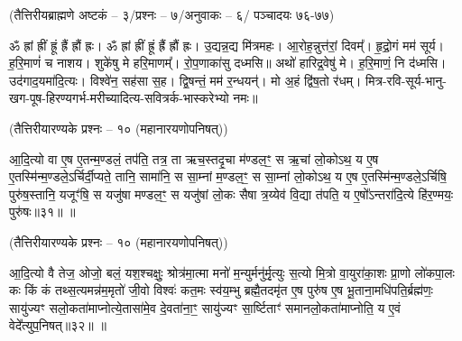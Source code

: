 \centerline{\normalsize (तैत्तिरीयब्राह्मणे अष्टकं – ३/प्रश्नः – ७/अनुवाकः – ६/ पञ्चादयः ७६-७७)}

ॐ ह्रां ह्रीं ह्रूं ह्रैं ह्रौं ह्रः। ॐ ह्रां ह्रीं ह्रूं ह्रैं ह्रौं ह्रः। 
उ॒द्यन्न॒द्य मि॑त्रमहः। 
आ॒रोह॒न्नुत्त॑रां॒ दिवम्᳚।
हृ॒द्रो॒गं मम॑ सूर्य।
ह॒रि॒माणं॑ च नाशय।
शुके॑षु मे हरि॒माणम्᳚।
रो॒प॒णाका॑सु दध्मसि॥
अथो॑ हारिद्र॒वेषु॑ मे।
ह॒रि॒माणं॒ नि द॑ध्मसि।
उद॑गाद॒यमा॑दि॒त्यः।
विश्वे॑न॒ सह॑सा स॒ह।
द्वि॒षन्तं॒ मम॑ र॒न्धयन्॑।
मो अ॒हं द्वि॑ष॒तो र॑धम्।
मित्र-रवि-सूर्य-भानु-खग-पूष-हिरण्यगर्भ-मरीच्यादित्य-सवित्रर्क-भास्करेभ्यो नमः॥

\centerline{\normalsize (तैत्तिरीयारण्यके प्रश्नः – १० (महानारयणोपनिषत्))}
आ॒दि॒त्यो वा ए॒ष ए॒तन्म॒ण्डलं॒ तप॑ति॒ तत्र॒ ता ऋच॒स्तदृ॒चा म॑ण्डल॒ꣳ॒ स ऋ॒चां लो॒कोऽथ॒ य ए॒ष ए॒तस्मि॑न्म॒ण्डले॒ऽर्चिर्दी॒प्यते॒ तानि॒ सामा॑नि॒ स सा॒म्नां म॒ण्डल॒ꣳ॒ स सा॒म्नां लो॒कोऽथ॒ य ए॒ष ए॒तस्मि॑न्म॒ण्डले॒ऽर्चिषि॒ पुरु॑ष॒स्तानि॒ यजूꣳ॑षि॒ स यजु॑षा मण्डल॒ꣳ॒ स यजु॑षां लो॒कः सैषा त्र॒य्येव॑ वि॒द्या त॑पति॒ य ए॒षो᳚ऽन्तरा॑दि॒त्ये हि॑र॒ण्मयः॒ पुरु॑षः॥३१॥
\devAya{}॥


\centerline{\normalsize (तैत्तिरीयारण्यके प्रश्नः – १० (महानारयणोपनिषत्))}
आ॒दि॒त्यो वै तेज॒ ओजो॒ बलं॒ यश॒श्चक्षुः॒ श्रोत्र॑मा॒त्मा मनो॑ म॒न्युर्मनु॑र्मृ॒त्युः स॒त्यो मि॒त्रो वा॒युरा॑का॒शः प्रा॒णो लो॑कपा॒लः कः किं कं तथ्स॒त्यमन्न॑म॒मृतो॑ जी॒वो विश्वः॑ कत॒मः स्व॑य॒म्भु ब्रह्मै॒तदमृ॑त ए॒ष पुरु॑ष ए॒ष भू॒ताना॒मधि॑पति॒र्ब्रह्म॑णः॒ सायु॑ज्यꣳ सलो॒कता॑माप्नोत्ये॒तासा॑मे॒व दे॒वता॑ना॒ꣳ॒ सायु॑ज्यꣳ सा॒र्ष्टिताꣳ॑ समानलो॒कता॑माप्नोति॒ य ए॒वं वेदे᳚त्युप॒निषत्॥३२॥
\devAya{}॥

\begingroup
\setlength{\parindent}{1.5em}
\makeatletter
  \def\vhrulefill#1{\leavevmode\leaders\hrule\@height#1\hfill \kern\z@}
\makeatother
\newcommand{\anuvakamend}[1][]{\refstepcounter{anuvakam}%
\newline\centerline{\devAya{}।}
\centerline{\textbf{ॐ नमो नारायणाय॥}}
\newline\mbox{}
\baselineskip=12pt\nolinebreak[4]\vhrulefill{1.6pt}\raisebox{-3pt}{\bfseries{[\devanumber{\arabic{anuvakam}}]}}%
\vspace{-1pt}
}
\renewcommand{\sect}[1]{}

\endgroup
\begingroup
\let\chapt\sect

\endgroup


